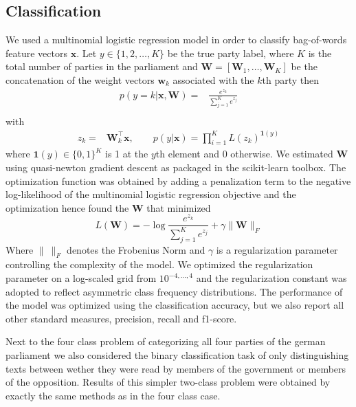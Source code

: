 \documentclass{article} %
\renewcommand{\vec}[1]{\mathbf{#1}}
\begin{document}
\subsection{Classification}
We used a multinomial logistic regression model in order to classify bag-of-words feature vectors $\vec{x}$. Let $y\in\{1,2,\dots,K\}$ be the true party label, where $K$ is the total number of parties in the parliament and $\vec{W}=[\vec{W}_1,\dots,\vec{W}_K]$ be the concatenation of the weight vectors $\vec{w}_k$ associated with the $k$th party then 
\begin{eqnarray}\label{eq:logreg_multiclass}
p(y=k|\vec{x},\vec{W}) = &\frac{e^{z_k}}{\sum_{j=1}^K e^{z_j}}\\\nonumber
\end{eqnarray}
with
\begin{eqnarray*}
 z_k=&\vec{W}_k^{\top}\vec{x}, \qquad
 p(y|\vec{x}) = \prod_{i=1}^K L(z_k)^{\vec{1}(y)}
\end{eqnarray*}
where $\vec{1}(y)\in\{0,1\}^{K}$ is 1 at the $y$th element and 0 otherwise. We estimated $\vec{W}$ using quasi-newton gradient descent as packaged in the scikit-learn toolbox. The optimization function was obtained by adding a penalization term to the negative log-likelihood of the multinomial logistic regression objective and the optimization hence found the $\vec{W}$ that minimized
\begin{equation}\label{eq:objective}
L(\vec{W}) = - \log{\frac{e^{z_k}}{\sum_{j=1}^K e^{z_j}}}+ \gamma \| \vec{W} \|_{F}
\end{equation}
Where $\|~\|_F$ denotes the Frobenius Norm and $\gamma$ is a regularization parameter controlling the complexity of the model. 
 We optimized the regularization parameter on a log-scaled grid from $10^{-4,\dots,4}$ and the regularization constant was adopted to reflect asymmetric class frequency distributions. The performance of the model was optimized using the classification accuracy, but we also report all other standard measures, precision, recall and f1-score. 

Next to the four class problem of categorizing all four parties of the german parliament we also considered the binary classification task of only distinguishing texts between wether they were read by members of the government or members of the opposition. Results of this simpler two-class problem were obtained by exactly the same methods as in the four class case. 
\end{document}
